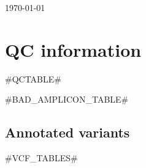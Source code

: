 \documentclass[11pt]{article}
\newcommand{\lightfont}{\fontseries{l}\selectfont}
\renewcommand{\arraystretch}{1.5}
\begin{document}
\begin{landscape}
\noindent
{\fontsize{16pt}{16pt}\selectfont {}}

\medskip
\noindent
{\lightfont \today}

%
\section{QC information}

{{#QCTABLE#}}

\end{landscape}

{{#BAD_AMPLICON_TABLE#}}

\begin{landscape}
\renewcommand{\arraystretch}{1.4}
\section{Annotated variants}
\footnotesize
{#VCF_TABLES#}

\end{landscape}
%
%
%
%
%

\end{document}
